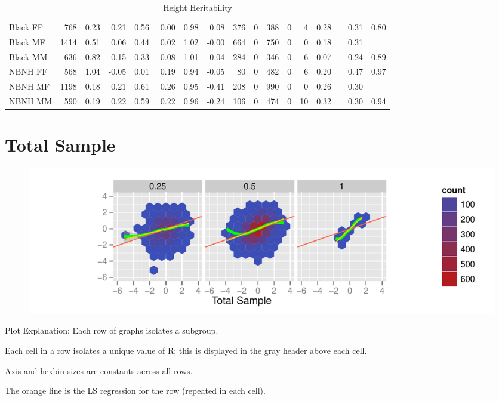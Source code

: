 \documentclass[a4paper]{article}
\begin{document}
\begin{table}[ht]
\begin{center}
\begin{tabular}{lr|rrr|rrr|rrrrr|rrrr}
   \hline
Black FF & 768 & 0.23 & 0.21 & 0.56 & 0.00 & 0.98 & 0.08 & 376 & 0 & 388 & 0 & 4 & 0.28 &  & 0.31 & 0.80 \\ 
  Black MF & 1414 & 0.51 & 0.06 & 0.44 & 0.02 & 1.02 & -0.00 & 664 & 0 & 750 & 0 & 0 & 0.18 &  & 0.31 &  \\ 
  Black MM & 636 & 0.82 & -0.15 & 0.33 & -0.08 & 1.01 & 0.04 & 284 & 0 & 346 & 0 & 6 & 0.07 &  & 0.24 & 0.89 \\ 
   \hline
NBNH FF & 568 & 1.04 & -0.05 & 0.01 & 0.19 & 0.94 & -0.05 & 80 & 0 & 482 & 0 & 6 & 0.20 &  & 0.47 & 0.97 \\ 
  NBNH MF & 1198 & 0.18 & 0.21 & 0.61 & 0.26 & 0.95 & -0.41 & 208 & 0 & 990 & 0 & 0 & 0.26 &  & 0.30 &  \\ 
  NBNH MM & 590 & 0.19 & 0.22 & 0.59 & 0.22 & 0.96 & -0.24 & 106 & 0 & 474 & 0 & 10 & 0.32 &  & 0.30 & 0.94 \\ 
  \end{tabular}
\caption{Height Heritability}
\label{tab:two}
\end{center}
\end{table}%
\section{Total Sample}
\begin{figure}[htbp]
\includegraphics{Height-004}
\end{figure}
Plot Explanation: Each row of graphs isolates a subgroup.  

Each cell in a row isolates a unique value of R; this is displayed in the gray header above each cell. 

Axis and hexbin sizes are constants across all rows.

The orange line is the LS regression for the row (repeated in each cell).
\end{document}
